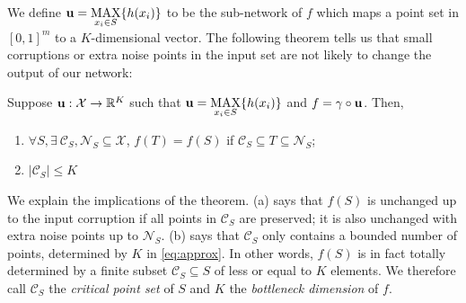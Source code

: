 We define $\mathbf u=\underset{x_i\in S}{\mbox{MAX}}\{h(x_i)\}$ to be the sub-network of $f$ which maps a point set in $[0,1]^m$ to a $K$-dimensional vector. The following theorem tells us that small corruptions or extra noise points in the input set are not likely to change the output of our network:
\begin{theorem}
Suppose $\mathbf u:\mathcal{X}\rightarrow \mathbb{R}^K$ such that $\mathbf u=\underset{x_i\in S}{\mbox{MAX}}\{h(x_i)\}$ and $f=\gamma \circ \mathbf u$. Then, 
\begin{enumerate}[label=(\alph*)]   
    \item $\forall S, \exists~\mathcal{C}_S, \mathcal{N}_S\subseteq \mathcal{X}$,  $f(T)=f(S)$ if  $\mathcal{C}_S\subseteq T\subseteq \mathcal{N}_S$;
    \item $|\mathcal{C}_S| \le K$
\end{enumerate}
\label{thm:thm2}
\end{theorem}
We explain the implications of the theorem. (a) says that $f(S)$ is unchanged up to the input corruption if all points in $\mathcal{C}_S$ are preserved; it is also unchanged with extra noise points up to $\mathcal{N}_S$. (b) says that $\mathcal{C}_S$ only contains a bounded number of points, determined by $K$ in \eqref{eq:approx}. In other words, $f(S)$ is in fact totally determined by a finite subset $\mathcal{C}_S\subseteq S$ of less or equal to $K$ elements. We therefore call $\mathcal{C}_S$ the \emph{critical point set} of $S$ and $K$ the \emph{bottleneck dimension} of $f$. 


